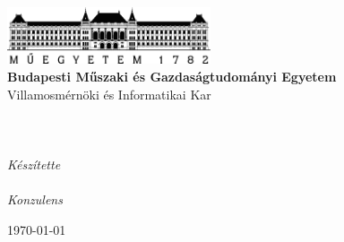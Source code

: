 \begin{titlepage}
\begin{center}
\includegraphics[width=60mm,keepaspectratio]{figures/BMElogo.png}\\
\vspace{0.3cm}
\textbf{Budapesti Műszaki és Gazdaságtudományi Egyetem}\\
\textmd{Villamosmérnöki és Informatikai Kar}\\
\textmd{\viktanszek}\\[5cm]

\vspace{0.4cm}
{\huge \bfseries \vikcim}\\[0.8cm]
\vspace{0.5cm}
\textsc{\Large \vikdoktipus}\\[4cm]


{\emph{Készítette}}\\
{\vikszerzo}\\[2.0cm]
{\emph{Konzulens}}\\
{\vikkonzulens}


\vfill
{\large \today}
\end{center}
\end{titlepage}


